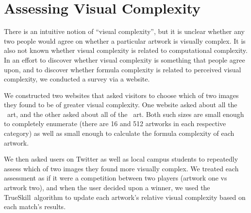 \section{Assessing Visual Complexity}

\label{sec:visual}

There is an intuitive notion of ``visual complexity'', but it is unclear
whether any two people would agree on whether a particular artwork is visually
complex. It is also not known whether visual complexity is related to
computational complexity.  In an effort to discover whether visual complexity
is something that people agree upon, and to discover whether formula complexity
is related to perceived visual complexity, we conducted a survey via a website.

We constructed two websites that asked visitors to choose which of two images
they found to be of greater visual complexity.  One website asked about all the
\twoxtwo\ art, and the other asked about all of the \threexthree\ art.  Both
such sizes are small enough to completely enumerate (there are 16 and 512
artworks in each respective category) as well as small enough to calculate the
formula complexity of each artwork.

We then asked users on Twitter as well as local campus students to repeatedly
assess which of two images they found more visually complex.  We treated each
assessment as if it were a competition between two players (artwork one vs
artwork two), and when the user decided upon a winner, we used the
TrueSkill\texttrademark\cite{trueskill}\ algorithm to update each artwork's relative visual
complexity based on each match's results.
